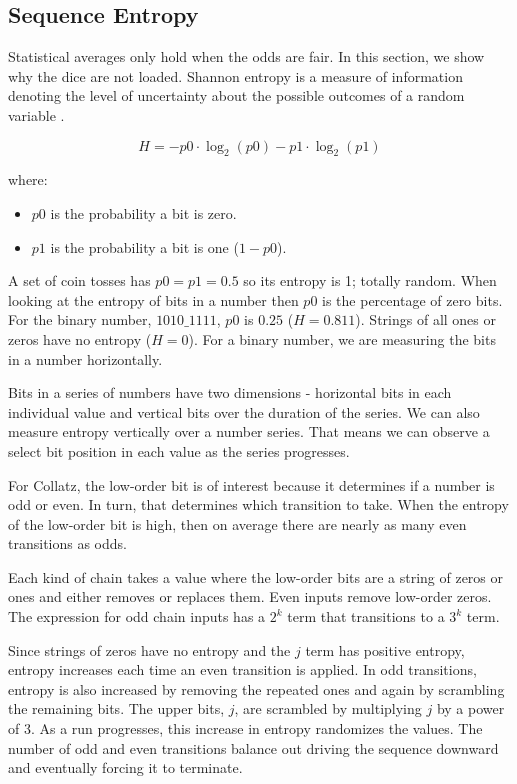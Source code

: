 \documentclass[letterpaper]{article}
\begin{document}
\begin{multicols}{2}
    \section{Sequence Entropy}

    Statistical averages only hold when the odds are fair. In this section, we show why the dice are not loaded. Shannon entropy is a measure of information denoting the level of uncertainty about the possible outcomes of a random variable \cite{1}.

    \[
        H = -p0 \cdot \log_2(p0) - p1 \cdot \log_2(p1)
    \]

    where:
    \begin{itemize}
        \item $p0$ is the probability a bit is zero.
        \item $p1$ is the probability a bit is one ($1 - p0$).
    \end{itemize}

    A set of coin tosses has $p0 = p1 = 0.5$ so its entropy is 1; totally random. When looking at the entropy of bits in a number then $p0$ is the percentage of zero bits. For the binary number, $1010\_1111$, $p0$ is $0.25$ ($H = 0.811$). Strings of all ones or zeros have no entropy ($H = 0$). For a binary number, we are measuring the bits in a number horizontally.

    Bits in a series of numbers have two dimensions - horizontal bits in each individual value and vertical bits over the duration of the series. We can also measure entropy vertically over a number series. That means we can observe a select bit position in each value as the series progresses.

    For Collatz, the low-order bit is of interest because it determines if a number is odd or even. In turn, that determines which transition to take. When the entropy of the low-order bit is high, then on average there are nearly as many even transitions as odds.

    Each kind of chain takes a value where the low-order bits are a string of zeros or ones and either removes or replaces them. Even inputs remove low-order zeros. The expression for odd chain inputs has a $2^k$ term that transitions to a $3^k$ term.

    Since strings of zeros have no entropy and the $j$ term has positive entropy, entropy increases each time an even transition is applied. In odd transitions, entropy is also increased by removing the repeated ones and again by scrambling the remaining bits. The upper bits, $j$, are scrambled by multiplying $j$ by a power of 3. As a run progresses, this increase in entropy randomizes the values. The number of odd and even transitions balance out driving the sequence downward and eventually forcing it to terminate.


\end{multicols}
\end{document}
